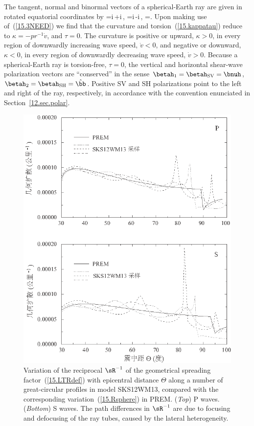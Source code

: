 The tangent, normal and binormal vectors  of a spherical-Earth ray
are given in rotated equatorial coordinates by
\eq \label{15.3NEED}
\hat{\bp}=\cos i\,\brh+\sin i\,\bphih,\qquad
\bnuh=\sin i\,\brh-\cos i\,\bphih,\qquad
\hat{\bb}=\bthetah.
\en
Upon making use of~(\ref{15.3NEED}) we find that the curvature
and torsion~(\ref{15.kappatau}) reduce to $\kappa=-pr^{-1}\dot{v}$,
and $\tau=0$.
The curvature is positive or upward, $\kappa>0$, in every
region of downwardly increasing wave speed, $\dot{v}<0$,
and negative or downward, $\kappa<0$, in every
region of downwardly decreasing wave speed, $\dot{v}>0$.
Because a spherical-Earth ray is torsion-free,
$\tau=0$, the vertical and horizontal shear-wave
polarization vectors are ``conserved'' in the sense
$\betah_1=\betah_{\rm SV}=\bnuh$,
$\betah_2=\betah_{\rm SH}=\hat{\bb}$.
Positive SV and SH polarizations point to the left and
right of the ray, respectively, in accordance with the
convention enunciated in Section~\ref{12.sec.polar}.
%
%
\begin{figure}[!b]
\begin{center}
\includegraphics{../figures/chap15/fig08.eps}
\end{center}
\caption[spreading factor]
{\label{15.fig.LTfig3}
Variation of the reciprocal $\sR^{-1}$ of the
geometrical spreading factor~(\ref{15.LTRdef})
with epicentral distance $\Theta$ along a number of
great-circular profiles in model SKS12WM13, compared
with the corresponding variation~(\ref{15.Rsphere}) in PREM.
({\em Top\/}) P waves.  ({\em Bottom\/}) S waves.
The path differences in $\sR^{-1}$ are due to focusing and defocusing of the ray tubes,
caused by the lateral heterogeneity.}
\end{figure}

